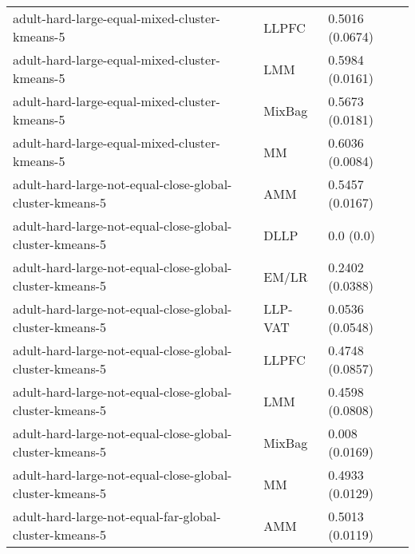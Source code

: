 \begin{longtable}{lll}
                                                                adult-hard-large-equal-mixed-cluster-kmeans-5 &     LLPFC &                       0.5016 (0.0674) \\
                                                                adult-hard-large-equal-mixed-cluster-kmeans-5 &       LMM &                       0.5984 (0.0161) \\
                                                                adult-hard-large-equal-mixed-cluster-kmeans-5 &    MixBag &                       0.5673 (0.0181) \\
                                                                adult-hard-large-equal-mixed-cluster-kmeans-5 &        MM &                       0.6036 (0.0084) \\
                                                     adult-hard-large-not-equal-close-global-cluster-kmeans-5 &       AMM &                       0.5457 (0.0167) \\
                                                     adult-hard-large-not-equal-close-global-cluster-kmeans-5 &      DLLP &                             0.0 (0.0) \\
                                                     adult-hard-large-not-equal-close-global-cluster-kmeans-5 &     EM/LR &                       0.2402 (0.0388) \\
                                                     adult-hard-large-not-equal-close-global-cluster-kmeans-5 &   LLP-VAT &                       0.0536 (0.0548) \\
                                                     adult-hard-large-not-equal-close-global-cluster-kmeans-5 &     LLPFC &                       0.4748 (0.0857) \\
                                                     adult-hard-large-not-equal-close-global-cluster-kmeans-5 &       LMM &                       0.4598 (0.0808) \\
                                                     adult-hard-large-not-equal-close-global-cluster-kmeans-5 &    MixBag &                        0.008 (0.0169) \\
                                                     adult-hard-large-not-equal-close-global-cluster-kmeans-5 &        MM &                       0.4933 (0.0129) \\
                                                       adult-hard-large-not-equal-far-global-cluster-kmeans-5 &       AMM &                       0.5013 (0.0119) \\

\end{longtable}
